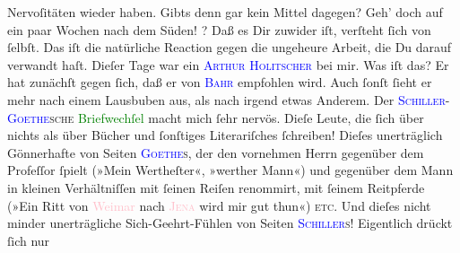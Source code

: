                Nervoſitäten wieder haben. Gibts denn {\pb}gar kein
               Mittel dagegen? Geh’ doch auf ein paar Wochen nach dem Süden!\pend
           \pstart
           \label{K_L02786-4v}\label{K_L02786-4h}? Daß es Dir zuwider iſt, verſteht
               ſich von ſelbſt. Das iſt die natürliche Reaction gegen die ungeheure Arbeit, die Du
               darauf verwandt haſt.\pend
           \pstart
           Dieſer Tage war ein \textsc{\textcolor{blue}{Arthur Holitscher}{}\ledrightnote{\textcolor{blue}{Arthur Holitscher}}} bei mir. Was iſt das? Er hat zunächſt gegen ſich, daß er von \textsc{\textcolor{blue}{Bahr}{}\ledrightnote{\textcolor{blue}{Hermann Bahr}}} empfohlen wird. Auch ſonſt ſieht er mehr nach einem Lausbuben aus, als nach
               irgend etwas Anderem.\pend
           \pstart
           Der \textsc{\textcolor{blue}{Schiller}{}\ledrightnote{\textcolor{blue}{Friedrich von Schiller}}-\textcolor{blue}{Goethe}{}\ledrightnote{\textcolor{blue}{Johann Wolfgang von Goethe}}sche}{ }\textcolor{green}{Briefwechſel}{}\ledrightnote{\textcolor{green}{Briefwechsel zwischen Schiller und Goethe}} macht mich ſehr {\pb}nervös. Dieſe Leute, die ſich über nichts als über
               Bücher und ſonſtiges Literariſches ſchreiben! Dieſes unerträglich Gönnerhafte von
               Seiten \textsc{\textcolor{blue}{Goethe}{}\ledrightnote{\textcolor{blue}{Johann Wolfgang von Goethe}}s}, der den vornehmen Herrn
               gegenüber dem Profeſſor ſpielt (»Mein Wertheſter«, »werther Mann«) und gegenüber dem
               Mann in kleinen Verhältniſſen mit ſeinen Reiſen renommirt,  mit ſeinem Reitpferde (»Ein Ritt von \textcolor{pink}{Weimar}{}\ledrightnote{\textcolor{pink}{Weimar}} nach \textsc{\textcolor{pink}{Jena}{}\ledrightnote{\textcolor{pink}{Jena}}} wird mir gut thun«) \textsc{etc}. Und dieſes nicht minder
               unerträgliche Sich-Geehrt-Fühlen von Seiten \textsc{\textcolor{blue}{Schiller}{}\ledrightnote{\textcolor{blue}{Friedrich von Schiller}}s}! Eigentlich drückt ſich nur
